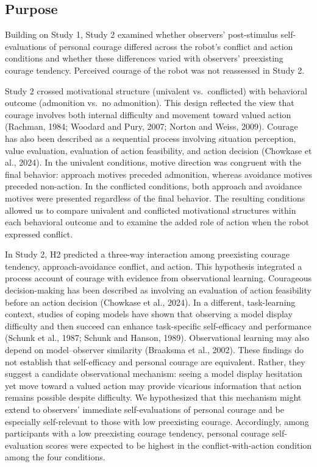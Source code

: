 \documentclass[utf8]{FrontiersinHarvard}
\begin{document}
\subsection{Purpose}\label{purpose-1}

Building on Study 1, Study 2 examined whether observers' post-stimulus self-evaluations of personal courage differed across the robot's conflict and action conditions and whether these differences varied with observers' preexisting courage tendency. Perceived courage of the robot was not reassessed in Study 2.

Study 2 crossed motivational structure (univalent vs.~conflicted) with behavioral outcome (admonition vs.~no admonition). This design reflected the view that courage involves both internal difficulty and movement toward valued action (Rachman, 1984; Woodard and Pury, 2007; Norton and Weiss, 2009). Courage has also been described as a sequential process involving situation perception, value evaluation, evaluation of action feasibility, and action decision (Chowkase et al., 2024). In the univalent conditions, motive direction was congruent with the final behavior: approach motives preceded admonition, whereas avoidance motives preceded non-action. In the conflicted conditions, both approach and avoidance motives were presented regardless of the final behavior. The resulting conditions allowed us to compare univalent and conflicted motivational structures within each behavioral outcome and to examine the added role of action when the robot expressed conflict.

In Study 2, H2 predicted a three-way interaction among preexisting courage tendency, approach-avoidance conflict, and action. This hypothesis integrated a process account of courage with evidence from observational learning. Courageous decision-making has been described as involving an evaluation of action feasibility before an action decision (Chowkase et al., 2024). In a different, task-learning context, studies of coping models have shown that observing a model display difficulty and then succeed can enhance task-specific self-efficacy and performance (Schunk et al., 1987; Schunk and Hanson, 1989). Observational learning may also depend on model--observer similarity (Braaksma et al., 2002). These findings do not establish that self-efficacy and personal courage are equivalent. Rather, they suggest a candidate observational mechanism: seeing a model display hesitation yet move toward a valued action may provide vicarious information that action remains possible despite difficulty. We hypothesized that this mechanism might extend to observers' immediate self-evaluations of personal courage and be especially self-relevant to those with low preexisting courage. Accordingly, among participants with a low preexisting courage tendency, personal courage self-evaluation scores were expected to be highest in the conflict-with-action condition among the four conditions.
\end{document}
